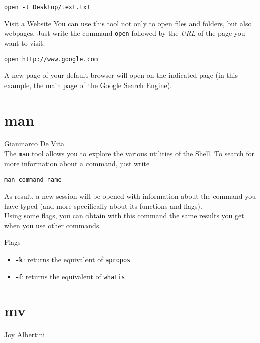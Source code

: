 \documentclass[hidelinks,12pt,a4paper,numbers=enddot]{scrartcl}
\begin{document}
\begin{verbatim}
open -t Desktop/text.txt
\end{verbatim}

Visit a Website
You can use this tool not only to open files and folders, but also webpages.
Just write the command \texttt{open} followed by the \emph{URL} of the page
you want to visit.

\begin{verbatim}
open http://www.google.com
\end{verbatim}

A new page of your default browser will open on the indicated page (in this
example, the main page of the Google Search Engine).

\section{man}


\large Gianmarco De Vita \normalsize\\




The \texttt{man} tool allows you to explore the various utilities
of the Shell. To search for more information about a command, just write

\begin{verbatim}
man command-name
\end{verbatim}



As result, a new session will be opened with information about the command
you have typed (and more specifically about its functions and flags).\\

Using some flags, you can obtain with this command the same results you get
when you use other commands.


Flags

\begin{itemize}
    \item  \textbf{-k}: returns the equivalent of \texttt{apropos}
    \item  \textbf{-f}: returns the equivalent of \texttt{whatis}
\end{itemize}

\section{mv}


\large Joy Albertini \normalsize\\
\end{document}
